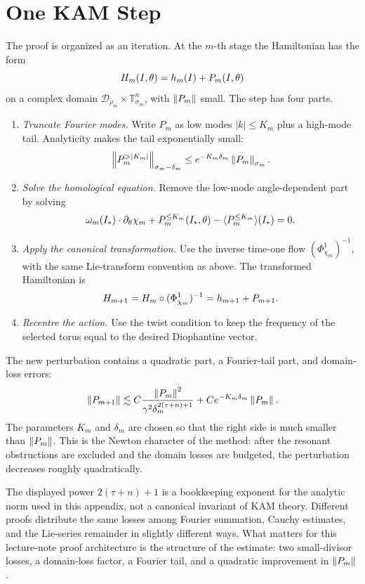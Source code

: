 \section{One KAM Step}
\label{sec:one-kam-step}

The proof is organized as an iteration.  At the \(m\)-th stage the Hamiltonian
has the form
\[
        H_m(I,\theta)
        =
        h_m(I)+P_m(I,\theta)
\]
on a complex domain
\(\mathcal{D}_{\rho_m}\times\mathbb{T}^n_{\sigma_m}\), with
\(\left\lVert P_m\right\rVert\) small.  The step has four parts.

\begin{enumerate}
\item \emph{Truncate Fourier modes.}  Write \(P_m\) as low modes
\(|k|\le K_m\) plus a high-mode tail.  Analyticity makes the tail
exponentially small:
\[
        \left\lVert P_m^{>|K_m|}\right\rVert_{\sigma_m-\delta_m}
        \le
        e^{-K_m\delta_m}\left\lVert P_m\right\rVert_{\sigma_m}.
\]
\item \emph{Solve the homological equation.}  Remove the low-mode
angle-dependent part by solving
\[
        \omega_m(I_*)\cdot\partial_\theta\chi_m
        +
        P_m^{\le K_m}(I_*,\theta)
        -
        \langle P_m^{\le K_m}\rangle(I_*)
        =0 .
\]
\item \emph{Apply the canonical transformation.}  Use the inverse time-one flow
\((\Phi_{\chi_m}^1)^{-1}\), with the same Lie-transform convention as above.
The transformed Hamiltonian is
\[
        H_{m+1}=H_m\circ(\Phi_{\chi_m}^1)^{-1}=h_{m+1}+P_{m+1}.
\]
\item \emph{Recentre the action.}  Use the twist condition to keep the
frequency of the selected torus equal to the desired Diophantine vector.
\end{enumerate}

The new perturbation contains a quadratic part, a Fourier-tail part, and
domain-loss errors:
\[
        \left\lVert P_{m+1}\right\rVert
        \lesssim
        C\frac{\left\lVert P_m\right\rVert^2}{\gamma^2\delta_m^{2(\tau+n)+1}}
        +
        C e^{-K_m\delta_m}\left\lVert P_m\right\rVert.
\]
The parameters \(K_m\) and \(\delta_m\) are chosen so that the right side is
much smaller than \(\left\lVert P_m\right\rVert\).  This is the Newton character of the method:
after the resonant obstructions are excluded and the domain losses are budgeted,
the perturbation decreases roughly quadratically.

The displayed power \(2(\tau+n)+1\) is a bookkeeping exponent for the analytic
norm used in this appendix, not a canonical invariant of KAM theory. Different
proofs distribute the same losses among Fourier summation, Cauchy estimates,
and the Lie-series remainder in slightly different ways. What matters for this
lecture-note proof architecture is the structure of the estimate: two
small-divisor losses, a domain-loss factor, a Fourier tail, and a quadratic
improvement in \(\left\lVert P_m\right\rVert\).

